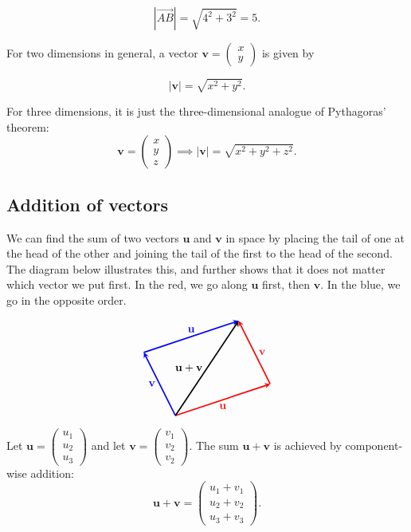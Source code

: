 \documentclass[a4paper,12pt]{amsart}
\begin{document}
    \[ \left| \vec{AB} \right| = \sqrt{4^2 + 3^2} = 5. \]

    For two dimensions in general, a vector $\textbf{v} = \begin{pmatrix} x \\ y \end{pmatrix}$ is given by

    \[ \left| \mathbf{v} \right| = \sqrt{x^2 + y^2}. \]

    For three dimensions, it is just the three-dimensional analogue of Pythagoras' theorem:
    \[ \mathbf{v} = \begin{pmatrix} x \\ y \\ z \end{pmatrix} \implies \left| \mathbf{v} \right| = \sqrt{x^2 + y^2 + z^2}. \]

    \subsection{Addition of vectors}

    We can find the sum of two vectors $\mathbf{u}$ and $\mathbf{v}$ in space by placing the tail of one at the head of the other and joining the tail of the first to the head of the second. The diagram below illustrates this, and further shows that it does not matter which vector we put first. In the red, we go along $\mathbf{u}$ first, then $\mathbf{v}$.  In the blue, we go in the opposite order.

    \[
        \begin{tikzpicture}[vector/.style={-stealth,very thick}]
            \coordinate (A) at (0,0);
            \coordinate (B) at (3,1);
            \coordinate (C) at (2,3);
            \coordinate (D) at (-1,2);
            \draw[vector, red] (A) -- (B) node[midway, below] {$\mathbf{u}$}; 
            \draw[vector, red] (B) -- (C) node[midway, right] {$\mathbf{v}$};
            \draw[vector] (A) -- (C) node[midway, left] {$\mathbf{u} + \mathbf{v}$};
            \draw[vector, blue] (A) -- (D) node[midway, left] {$\mathbf{v}$};
            \draw[vector, blue] (D) -- (C) node[midway, above] {$\mathbf{u}$};
        \end{tikzpicture}
    \]

    Let $\mathbf{u} = \begin{pmatrix} u_1 \\ u_2 \\ u_3 \end{pmatrix}$ and let $\mathbf{v} = \begin{pmatrix} v_1 \\ v_2 \\ v_2 \end{pmatrix}$. The sum $\mathbf{u} + \mathbf{v}$ is achieved by component-wise addition:
    \[ \mathbf{u} + \mathbf{v} = \begin{pmatrix} u_1 + v_1 \\ u_2 + v_2 \\ u_3 + v_3 \end{pmatrix}. \]
\end{document}
